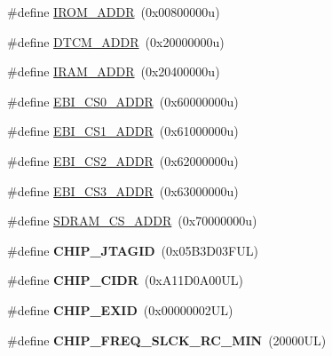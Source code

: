 \begin{DoxyCompactItemize}
\item 
\#define \mbox{\hyperlink{group__SAMS70Q19__definitions_ga694212ffb8c2786bacee3d0ad6020bda}{I\+R\+O\+M\+\_\+\+A\+D\+DR}}~(0x00800000u)
\item 
\#define \mbox{\hyperlink{group__SAMS70Q19__definitions_ga26626a425f7ebb3a0c2dbc276f0d9f78}{D\+T\+C\+M\+\_\+\+A\+D\+DR}}~(0x20000000u)
\item 
\#define \mbox{\hyperlink{group__SAMS70Q19__definitions_gaae45ac2ef16942159481c767ac4805cf}{I\+R\+A\+M\+\_\+\+A\+D\+DR}}~(0x20400000u)
\item 
\#define \mbox{\hyperlink{group__SAMS70Q19__definitions_ga9bcbb97ddae3b2cc5e2c9613d33f66b4}{E\+B\+I\+\_\+\+C\+S0\+\_\+\+A\+D\+DR}}~(0x60000000u)
\item 
\#define \mbox{\hyperlink{group__SAMS70Q19__definitions_gaaddd9fdbbc77c9aced5308819f502a26}{E\+B\+I\+\_\+\+C\+S1\+\_\+\+A\+D\+DR}}~(0x61000000u)
\item 
\#define \mbox{\hyperlink{group__SAMS70Q19__definitions_ga058a35f9991487dc2dd12ada792d0730}{E\+B\+I\+\_\+\+C\+S2\+\_\+\+A\+D\+DR}}~(0x62000000u)
\item 
\#define \mbox{\hyperlink{group__SAMS70Q19__definitions_gad66ebdd0fc33ec3cf85dbaa14bbf05d9}{E\+B\+I\+\_\+\+C\+S3\+\_\+\+A\+D\+DR}}~(0x63000000u)
\item 
\#define \mbox{\hyperlink{group__SAMS70Q19__definitions_ga61b7db25daf759c2a2beb6e5a0b57a84}{S\+D\+R\+A\+M\+\_\+\+C\+S\+\_\+\+A\+D\+DR}}~(0x70000000u)
\item 
\mbox{\label{group__SAMS70Q19__definitions_gaa614519778eec0df55d3eeab3223e3f6}} 
\#define {\bfseries C\+H\+I\+P\+\_\+\+J\+T\+A\+G\+ID}~(0x05\+B3\+D03\+F\+U\+L)
\item 
\mbox{\label{group__SAMS70Q19__definitions_ga1e1ae44dd9269a8a98c1d7e7a60e9fbd}} 
\#define {\bfseries C\+H\+I\+P\+\_\+\+C\+I\+DR}~(0x\+A11\+D0\+A00\+U\+L)
\item 
\mbox{\label{group__SAMS70Q19__definitions_ga35123717aa86b76bb6b73cf3adc4c2e6}} 
\#define {\bfseries C\+H\+I\+P\+\_\+\+E\+X\+ID}~(0x00000002\+U\+L)
\item 
\mbox{\label{group__SAMS70Q19__definitions_ga0e868bf27426399dfdcb3a9dfc3733c4}} 
\#define {\bfseries C\+H\+I\+P\+\_\+\+F\+R\+E\+Q\+\_\+\+S\+L\+C\+K\+\_\+\+R\+C\+\_\+\+M\+IN}~(20000\+U\+L)

\end{DoxyCompactItemize}
